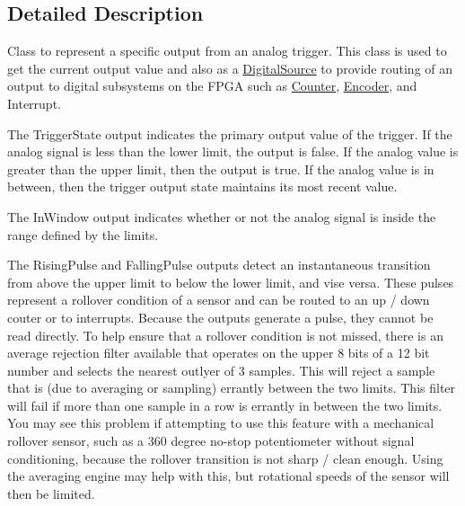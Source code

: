 \subsection{\-Detailed \-Description}
\-Class to represent a specific output from an analog trigger. \-This class is used to get the current output value and also as a \hyperlink{classDigitalSource}{\-Digital\-Source} to provide routing of an output to digital subsystems on the \-F\-P\-G\-A such as \hyperlink{classCounter}{\-Counter}, \hyperlink{classEncoder}{\-Encoder}, and \-Interrupt.

\-The \-Trigger\-State output indicates the primary output value of the trigger. \-If the analog signal is less than the lower limit, the output is false. \-If the analog value is greater than the upper limit, then the output is true. \-If the analog value is in between, then the trigger output state maintains its most recent value.

\-The \-In\-Window output indicates whether or not the analog signal is inside the range defined by the limits.

\-The \-Rising\-Pulse and \-Falling\-Pulse outputs detect an instantaneous transition from above the upper limit to below the lower limit, and vise versa. \-These pulses represent a rollover condition of a sensor and can be routed to an up / down couter or to interrupts. \-Because the outputs generate a pulse, they cannot be read directly. \-To help ensure that a rollover condition is not missed, there is an average rejection filter available that operates on the upper 8 bits of a 12 bit number and selects the nearest outlyer of 3 samples. \-This will reject a sample that is (due to averaging or sampling) errantly between the two limits. \-This filter will fail if more than one sample in a row is errantly in between the two limits. \-You may see this problem if attempting to use this feature with a mechanical rollover sensor, such as a 360 degree no-\/stop potentiometer without signal conditioning, because the rollover transition is not sharp / clean enough. \-Using the averaging engine may help with this, but rotational speeds of the sensor will then be limited. 


